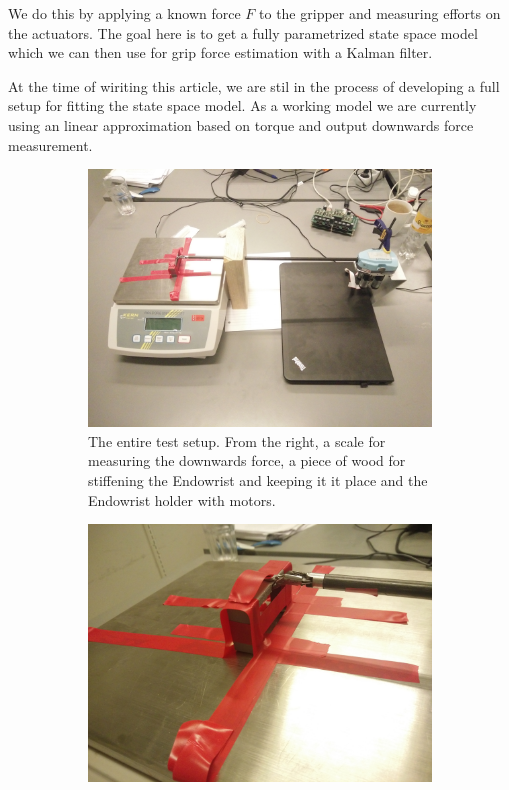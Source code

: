 \documentclass[conference]{IEEEtran}
\begin{document}
We do this by applying a known force $F$ to the gripper and measuring efforts on the actuators.
The goal here is to get a fully parametrized state space model which we can then use for grip force estimation with a Kalman filter.

At the time of wiriting this article, we are stil in the process of developing a full setup for fitting the state space model.
As a working model we are currently using an linear approximation based on torque and output downwards force measurement.

\begin{figure}
	\centering
	\begin{subfigure}{.45\linewidth}
		\centering
		\vspace{24pt}
		\includegraphics[width=\linewidth]{overall_force.jpg}
		\caption{The entire test setup. From the right, a scale for measuring the downwards force, a piece of wood for stiffening the Endowrist and keeping it it place and the Endowrist holder with motors.}
		\label{fig:entire_force_testsetup}
	\end{subfigure}
	\begin{subfigure}{.45\linewidth}
		\centering
		\includegraphics[width=\linewidth]{endeffector_force.jpg}

\end{subfigure}
\end{figure}
\end{document}
